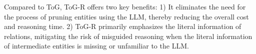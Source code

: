 







Compared to ToG, ToG-R offers two key benefits: 1) It eliminates the need for the process of pruning entities using the LLM, thereby reducing the overall cost and reasoning time. 2) ToG-R primarily emphasizes the literal information of relations, mitigating the risk of misguided reasoning when the literal information of intermediate entities is missing or unfamiliar to the LLM. 



